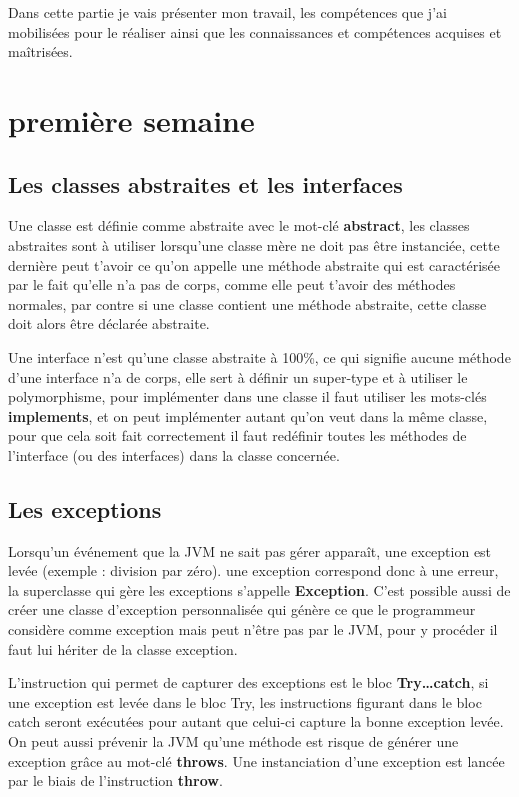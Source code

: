 \documentclass[12pt]{report}
\begin{document}
Dans cette partie je vais présenter mon travail, les compétences que j'ai mobilisées pour le réaliser ainsi que les connaissances et compétences acquises et maîtrisées.

\section{première semaine}

\subsection{Les classes abstraites et les interfaces}

Une classe est définie comme abstraite avec le mot-clé \textbf{abstract}, les classes abstraites sont à utiliser lorsqu'une classe mère ne doit pas être instanciée, cette dernière peut t'avoir ce qu'on appelle une méthode abstraite qui est caractérisée par le fait qu'elle n'a pas de corps, comme elle peut t'avoir des méthodes normales, par contre si une classe contient une méthode abstraite, cette classe doit alors être déclarée abstraite.\newline

Une interface n'est qu'une classe abstraite à 100\%, ce qui signifie aucune méthode d'une interface n'a de corps, elle sert à définir un super-type et à utiliser le polymorphisme, pour implémenter dans une classe il faut utiliser les mots-clés \textbf{implements}, et on peut implémenter autant qu'on veut dans la même classe, pour que cela soit fait correctement il faut redéfinir toutes les méthodes de l'interface (ou des interfaces) dans la classe concernée.

\subsection{Les exceptions}
Lorsqu'un événement que la JVM ne sait pas gérer apparaît, une exception est levée (exemple : division par zéro). une exception correspond donc à une erreur, la superclasse qui gère les exceptions s'appelle \textbf{Exception}. C'est possible aussi de créer une classe d'exception personnalisée qui génère ce que le programmeur considère comme exception mais peut n'être pas par le JVM, pour y procéder il faut lui hériter de la classe exception.\newline

L'instruction qui permet de capturer des exceptions est le bloc \textbf{Try{…}catch{}}, si une exception est levée dans le bloc Try, les instructions figurant dans le bloc catch seront exécutées pour autant que celui-ci capture la bonne exception levée. On peut aussi prévenir la JVM qu'une méthode est risque de générer une exception grâce au mot-clé \textbf{throws}. Une instanciation d'une exception est lancée par le biais de l'instruction \textbf{throw}.
\newpage
\end{document}

